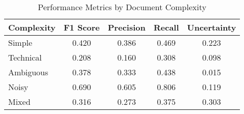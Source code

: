 \begin{table}[h]
\centering
\caption{Performance Metrics by Document Complexity}
\label{tab:complexity-performance}
\begin{tabular}{lcccc}
\toprule
\textbf{Complexity} & \textbf{F1 Score} & \textbf{Precision} & \textbf{Recall} & \textbf{Uncertainty} \\
\midrule
Simple & 0.420 & 0.386 & 0.469 & 0.223 \\
Technical & 0.208 & 0.160 & 0.308 & 0.098 \\
Ambiguous & 0.378 & 0.333 & 0.438 & 0.015 \\
Noisy & 0.690 & 0.605 & 0.806 & 0.119 \\
Mixed & 0.316 & 0.273 & 0.375 & 0.303 \\
\bottomrule
\end{tabular}
\end{table}